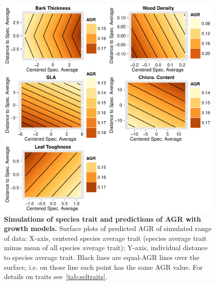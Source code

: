 \begin{figure}[!ht]
	\centering
	\includegraphics{figures/Sel_Traits_Simul_Pred_AGR_2015-05-22.pdf}
	\caption{\textbf{Simulations of species trait and predictions of AGR with growth models.} Surface plots of predicted AGR of simulated range of data: X-axis, centered species average trait (species average trait minus mean of all species average trait); Y-axis, individual distance to species average trait. Black lines are equal-AGR lines over the surface, i.e. on those line each point has the same AGR value. For details on traits see~\autoref{tab:seltraits}.}
	\label{fig:simul}
\end{figure}